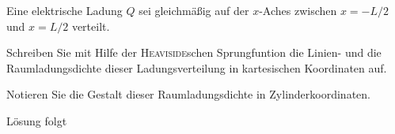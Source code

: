\documentclass{atistandalonetask}
\begin{document}
  \begin{atiTask}[
    title = Die \textsc{Heaviside}sche Sprungfunktion
  ]
  
  Eine elektrische Ladung $Q$ sei gleichmäßig auf der $x$-Aches zwischen $x=-L/2$ und $x=L/2$ verteilt.
    \begin{atiSubtasks}
    	\item Schreiben Sie mit Hilfe der \textsc{Heaviside}schen Sprungfuntion die Linien- und die Raumladungsdichte dieser Ladungsverteilung in kartesischen Koordinaten auf.
    	\item Notieren Sie die Gestalt dieser Raumladungsdichte in Zylinderkoordinaten.
    \end{atiSubtasks}	
  \end{atiTask}
  \begin{atiSolution}
   	Lösung folgt
  \end{atiSolution}
\end{document}
